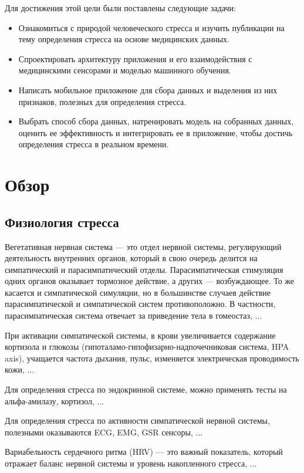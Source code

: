 \documentclass[14pt]{matmex-diploma-custom}
\begin{document}
Для достижения этой цели были поставлены следующие задачи:

\begin{itemize}
\item Ознакомиться с природой человеческого стресса и изучить публикации на тему
  определения стресса на основе медицинских данных.
\item Спроектировать архитектуру приложения и его взаимодействия с медицинскими
  сенсорами и моделью машинного обучения.
\item Написать мобильное приложение для сбора данных и выделения из них
  признаков, полезных для определения стресса.
\item Выбрать способ сбора данных, натренировать модель на собранных данных,
  оценить ее эффективность и интегрировать ее в приложение, чтобы достичь
  определения стресса в реальном времени.
\end{itemize}

\section{Обзор}
\subsection{Физиология стресса}
Вегетативная нервная система — это отдел нервной системы, регулирующий
деятельность внутренних органов, который в свою очередь делится на симпатический
и парасимпатический отделы. Парасимпатическая стимуляция одних органов оказывает
тормозное действие, а других — возбуждающее. То же касается и симпатической
симуляции, но в большинстве случаев действие парасимпатической и симпатической
систем противоположно. В частности, парасимпатическая система отвечает за
приведение тела в гомеостаз, ...

При активации симпатической системы, в крови увеличивается содержание кортизола
и глюкозы (гипоталамо-гипофизарно-надпочечниковая система, HPA axis), учащается
частота дыхания, пульс, изменяется электрическая проводимость кожи, ...

Для определения стресса по эндокринной системе, можно применять тесты на
альфа-амилазу, кортизол, ...

Для определения стресса по активности симпатической нервной системы, полезными
оказываются ECG, EMG, GSR сенсоры, ...

Вариабельность сердечного ритма (HRV) — это важный показатель, который отражает
баланс нервной системы и уровень накопленного стресса, ...
\end{document}
